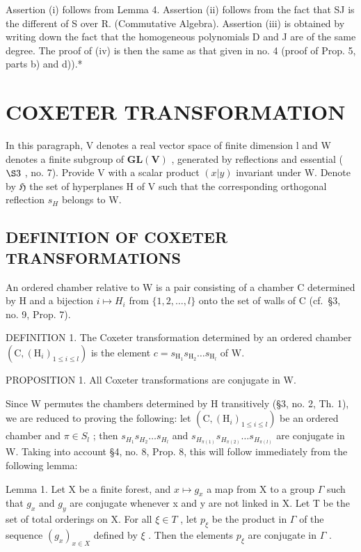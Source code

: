 Assertion (i) follows from Lemma 4. Assertion (ii) follows from the fact that SJ is the different of S over R. (Commutative Algebra). Assertion (iii) is obtained by writing down the fact that the homogeneous polynomials D and J are of the same degree. The proof of (iv) is then the same as that given in no. 4 (proof of Prop. 5, parts b) and d)).*

\section{COXETER TRANSFORMATION}

In this paragraph, V denotes a real vector space of finite dimension l and W denotes a finite subgroup of \(\mathbf{GL}(\mathbf{V})\) , generated by reflections and essential ( \(\S3\) , no. 7). Provide V with a scalar product \((x|y)\) invariant under W. Denote by \(\mathfrak{H}\) the set of hyperplanes H of V such that the corresponding orthogonal reflection \(s_{H}\) belongs to W.

\subsection{DEFINITION OF COXETER TRANSFORMATIONS}

An ordered chamber relative to W is a pair consisting of a chamber C determined by H and a bijection \(i \mapsto H_{i}\) from \(\{1, 2, \ldots, l\}\) onto the set of walls of C (cf.~§3, no. 9, Prop. 7).

DEFINITION 1. The Coxeter transformation determined by an ordered chamber \((\mathrm{C},(\mathrm{H}_i)_{1\leqslant i\leqslant l})\) is the element \(c = s_{\mathrm{H}_1}s_{\mathrm{H}_2}\dots s_{\mathrm{H}_l}\) of W.

PROPOSITION 1. All Coxeter transformations are conjugate in W.

Since W permutes the chambers determined by H transitively (§3, no. 2, Th. 1), we are reduced to proving the following: let \((\mathrm{C},(\mathrm{H}_{i})_{1\leqslant i\leqslant l})\) be an ordered chamber and \(\pi\in S_{l}\) ; then \(s_{H_{1}}s_{H_{2}}\ldots s_{H_{l}}\) and \(s_{H_{\pi(1)}}s_{H_{\pi(2)}}\ldots s_{H_{\pi(l)}}\) are conjugate in W. Taking into account §4, no. 8, Prop. 8, this will follow immediately from the following lemma:

Lemma 1. Let X be a finite forest, and \(x \mapsto g_{x}\) a map from X to a group \(\Gamma\) such that \(g_{x}\) and \(g_{y}\) are conjugate whenever x and y are not linked in X. Let T be the set of total orderings on X. For all \(\xi \in T\) , let \(p_{\xi}\) be the product in \(\Gamma\) of the sequence \((g_{x})_{x \in X}\) defined by \(\xi\) . Then the elements \(p_{\xi}\) are conjugate in \(\Gamma\) .

